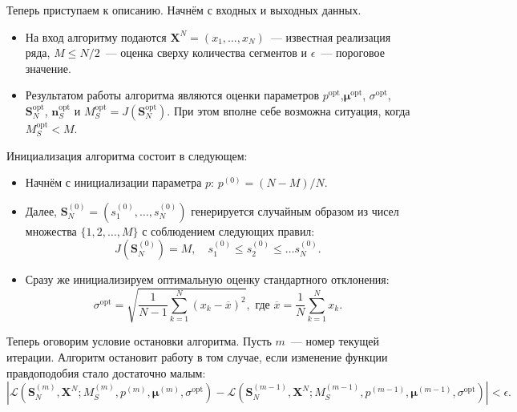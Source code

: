 Теперь приступаем к описанию. Начнём с входных и выходных данных.
\begin{itemize}
	\item На вход алгоритму подаются \(\mathbf{X}^{N} = (x_{1}, \ldots, 
	x_{N})\)~--- известная реализация ряда, \(M \leq N/2\)~--- оценка сверху 
	количества сегментов и \(\epsilon\)~--- пороговое значение.
	
	\item Результатом работы алгоритма являются оценки параметров 
	\(p^{\mathrm{opt}}\),\(\bm{\mu}^{\mathrm{opt}}\), 
	\(\sigma^{\mathrm{opt}}\), \(\mathbf{S}_{N}^{\mathrm{opt}}\), 
	\(\mathbf{n}_{S}^{\mathrm{opt}}\) и \(M_{S}^{\mathrm{opt}} = 
	J(\mathbf{S}_{N}^{\mathrm{opt}})\). При этом вполне себе возможна ситуация, 
	когда \(M_{S}^{\mathrm{opt}} < M\).
\end{itemize}

Инициализация алгоритма состоит в следующем:
\begin{itemize}
	\item Начнём с инициализации параметра \(p\): \(p^{(0)} = (N - M)/N\).
	
	\item Далее, \(\mathbf{S}_{N}^{(0)} = (s_{1}^{(0)}, \ldots, s_{N}^{(0)})\) 
	генерируется случайным образом из чисел множества \(\{1, 2, \ldots, M\}\) с 
	соблюдением следующих правил:
	\[
		J(\mathbf{S}_{N}^{(0)}) = M, \quad s_{1}^{(0)} \leq s_{2}^{(0)} \leq 
		\ldots s_{N}^{(0)}.
	\]
	
	\item Сразу же инициализируем оптимальную оценку стандартного отклонения:
	\[
		\sigma^{\mathrm{opt}} = \sqrt{\frac{1}{N - 1}\sum_{k = 1}^{N}(x_{k} - 
		\overline{x})^{2}}, \text{ где } \overline{x} = \frac{1}{N}\sum_{k = 
		1}^{N}x_{k}.
	\]
\end{itemize}

Теперь оговорим условие остановки алгоритма. Пусть \(m\)~--- номер текущей 
итерации. Алгоритм остановит работу в том случае, если изменение функции 
правдоподобия стало достаточно малым:
\[
	|\mathcal{L}(\mathbf{S}_{N}^{(m)}, \mathbf{X}^{N}; M_{S}^{(m)}, p^{(m)}, 
	\bm{\mu}^{(m)}, \sigma^{\mathrm{opt}}) - \mathcal{L}(\mathbf{S}_{N}^{(m - 
	1)}, \mathbf{X}^{N}; M_{S}^{(m - 1)}, p^{(m - 1)}, \bm{\mu}^{(m - 1)}, 
	\sigma^{\mathrm{opt}})| < \epsilon.
\]

